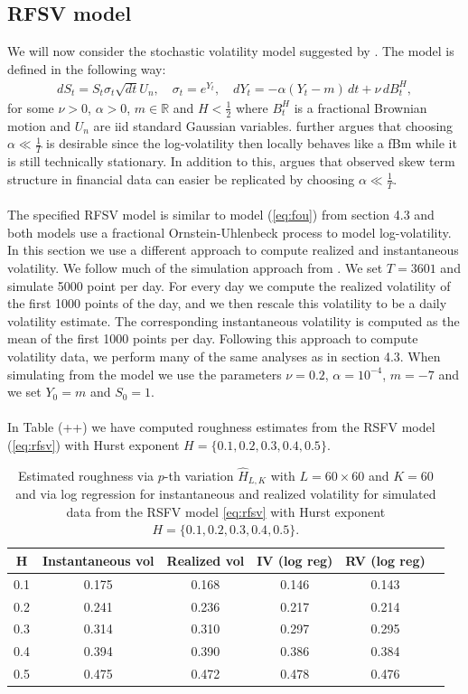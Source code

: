 \documentclass{article}
\begin{document}
\subsection{RFSV model}
We will now consider the stochastic volatility model suggested by \cite{gatheral}. The model is defined in the following way:
\begin{align}
dS_t = S_t \sigma_t \sqrt{dt}U_n, \quad \sigma_t = e^{Y_t}, \quad dY_t = -\alpha (Y_t-m) \, dt + \nu \, dB^H_t, \label{eq:rfsv}
\end{align}
for some $\nu>0$, $\alpha>0$, $m\in\mathbb{R}$ and $H<\frac{1}{2}$ where $B^H_t$ is a fractional Brownian motion and $U_n$ are iid standard Gaussian variables. \cite{gatheral} further argues that choosing $\alpha \ll \frac{1}{T}$ is desirable since the log-volatility then locally behaves like a fBm while it is still technically stationary. In addition to this, \cite{gatheral} argues that observed skew term structure in financial data can easier be replicated by choosing $\alpha \ll \frac{1}{T}$.\\\\
The specified RFSV model is similar to model (\ref{eq:fou}) from section 4.3 and both models use a fractional Ornstein-Uhlenbeck process to model log-volatility. In this section we use a different approach to compute realized and instantaneous volatility. We follow much of the simulation approach from \cite{gatheral}. We set $T=3601$ and simulate 5000 point per day. For every day we compute the realized volatility of the first 1000 points of the day, and we then rescale this volatility to be a daily volatility estimate. The corresponding instantaneous volatility is computed as the mean of the first 1000 points per day. Following this approach to compute volatility data, we perform many of the same analyses as in section 4.3. When simulating from the model we use the parameters $\nu = 0.2$, $\alpha = 10^{-4}$, $m = -7$ and we set $Y_0=m$ and $S_0 = 1$.\\\\
In Table (++) we have computed roughness estimates from the RSFV model (\ref{eq:rfsv}) with Hurst exponent $H= \{0.1,0.2,0.3,0.4,0.5\}$.
\begin{table}[htbp]
    \centering
    \begin{tabular}{cccccc}
        \toprule
        H & Instantaneous vol & Realized vol & IV (log reg) & RV (log reg)\\
        \midrule
        0.1 & 0.175 & 0.168 & 0.146 & 0.143\\
        0.2 & 0.241 & 0.236 & 0.217 & 0.214\\
        0.3 & 0.314 & 0.310 & 0.297 & 0.295\\
        0.4 & 0.394 & 0.390 & 0.386 & 0.384\\
        0.5 & 0.475 & 0.472 & 0.478 & 0.476\\
        \bottomrule
    \end{tabular}
    \caption{Estimated roughness via $p$-th variation $\hat{H}_{L,K}$ with $L=60\times60$ and $K=60$ and via log regression for instantaneous and realized volatility for simulated data from the RSFV model \eqref{eq:rfsv} with Hurst exponent $H=\{0.1,0.2,0.3,0.4,0.5\}$.}
    \label{tab:ex7table}
\end{table}
\end{document}
